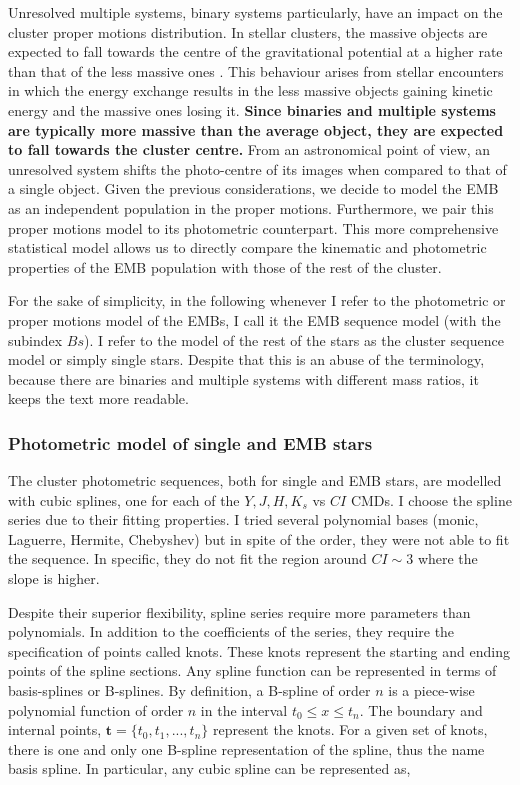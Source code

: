 Unresolved multiple systems, binary systems particularly, have an impact on the cluster proper motions distribution. In stellar clusters, the massive objects are expected to fall towards the centre of the gravitational potential at a higher rate than that of the less massive ones \textbf{\cite[see for example][p. 556]{Binney2008}}. This behaviour arises from stellar encounters in which the energy exchange results in the less massive objects gaining kinetic energy and the massive ones losing it. \textbf{Since binaries and multiple systems are typically more massive than the average object, they are expected to fall towards the cluster centre.} From an astronomical point of view, an unresolved system shifts the photo-centre of its images when compared to that of a single object. Given the previous considerations, we decide to model the EMB as an independent population in the proper motions. Furthermore, we pair this proper motions model to its photometric counterpart. This more comprehensive statistical model allows us to directly compare the kinematic and photometric properties of the EMB population with those of the rest of the cluster. 

For the sake of simplicity, in the following whenever I refer to the photometric or proper motions model of the EMBs, I call it the EMB sequence model (with the subindex $Bs$). I refer to the model of the rest of the stars as the cluster sequence model or simply single stars. Despite that this is an abuse of the terminology, because there are binaries and multiple systems with different mass ratios, it keeps the text more readable.

\subsubsection{Photometric model of single and EMB stars}

The cluster photometric sequences, both for single and EMB stars, are modelled with cubic splines, one for each of the $Y,J,H,K_s$ vs $CI$ CMDs. I choose the spline series due to their fitting properties. I tried several polynomial bases (monic, Laguerre, Hermite, Chebyshev) but in spite of the order, they were not able to fit the sequence. In specific, they do not fit the region around $CI \sim 3$ where the slope is higher. 

{\color{blue}
Despite their superior flexibility, spline series require more parameters than polynomials. In addition to the coefficients of the series, they require the specification of points called knots. These knots represent the starting and ending points of the spline sections. 
}
Any spline function can be represented in terms of basis-splines or B-splines. By definition, a B-spline of order $n$ is a piece-wise polynomial function of order $n$ in the interval $t_0 \leq x \leq t_n$. The boundary and internal points, $\mathbf{t}=\{t_0,t_1,...,t_n\}$ represent the knots. For a given set of knots, there is one and only one B-spline representation of the spline, thus the name basis spline.  In particular, any cubic spline can be represented as,

